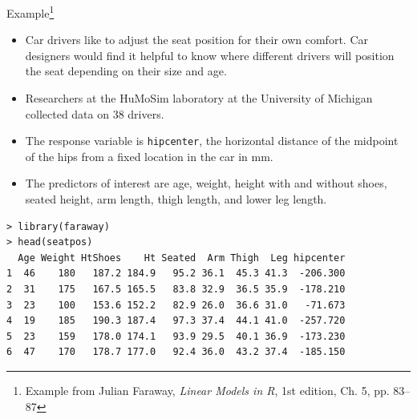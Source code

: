 \documentclass[10pt]{beamer}\usepackage[]{graphicx}\usepackage[]{color}
\begin{document}
\begin{frame}{Example\footnote{Example from Julian Faraway, \emph{Linear Models in R}, 1st edition, Ch. 5, pp. 83--87}}
\begin{itemize}
\item Car drivers like to adjust the seat position for their own comfort. Car designers would find it helpful to know where different drivers will position the seat depending on their size and age.
\vspace{5pt}
\item Researchers at the HuMoSim laboratory at the University of Michigan collected data on 38 drivers.
\vspace{5pt}
\item The response variable is \texttt{hipcenter}, the horizontal distance of the midpoint of the hips from a fixed location in the car in mm.
\vspace{5pt}
\item The predictors of interest are age, weight, height with and without shoes, seated height, arm length, thigh length, and lower leg length.
\end{itemize}
\end{frame}


\begin{frame}[fragile]
\small
\begin{verbatim}
> library(faraway)
> head(seatpos)
  Age Weight HtShoes    Ht Seated  Arm Thigh  Leg hipcenter
1  46    180   187.2 184.9   95.2 36.1  45.3 41.3  -206.300
2  31    175   167.5 165.5   83.8 32.9  36.5 35.9  -178.210
3  23    100   153.6 152.2   82.9 26.0  36.6 31.0   -71.673
4  19    185   190.3 187.4   97.3 37.4  44.1 41.0  -257.720
5  23    159   178.0 174.1   93.9 29.5  40.1 36.9  -173.230
6  47    170   178.7 177.0   92.4 36.0  43.2 37.4  -185.150
\end{verbatim}
\end{frame}
\end{document}
